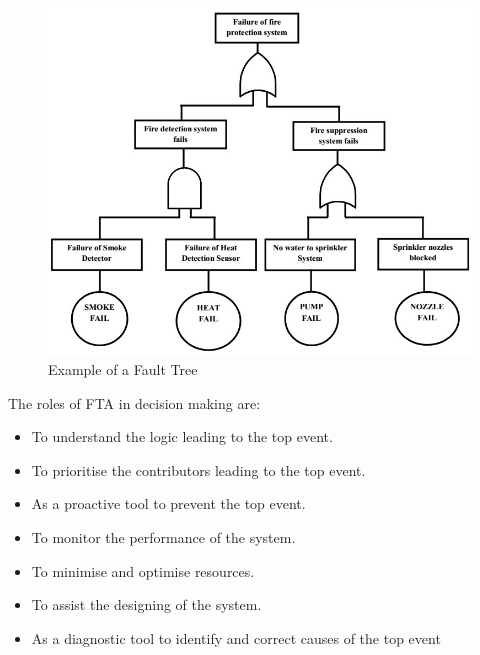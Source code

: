 \documentclass[10pt]{llncs}
\begin{document}
\begin{figure}[thpb]
      \centering
      
			\includegraphics[scale=0.5]{example_FT1}%
 	 
      \caption{Example of a Fault Tree\cite{John1998}}
      \label{fig3}
   \end{figure}	
	
The roles of FTA in decision making are\cite{Vesely2002}: 

\begin{itemize}
\item To understand the logic leading to the top event. 
\item To prioritise the contributors leading to the top event.
\item As a proactive tool to prevent the top event.
\item To monitor the performance of the system.
\item To minimise and optimise resources.
\item To assist the designing of the system.
\item As a diagnostic tool to identify and correct causes of the top event  
\end{itemize}
\end{document}
